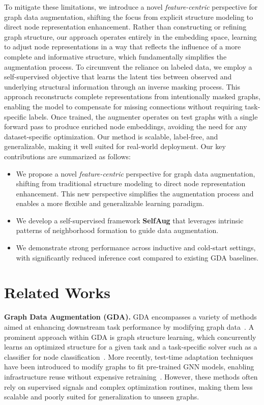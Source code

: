 \documentclass[letterpaper]{article} \usepackage{aaai2026}  \usepackage{times}  \usepackage{helvet}  \usepackage{courier}  \usepackage[hyphens]{url}  \usepackage{graphicx} \urlstyle{rm} \def\UrlFont{\rm}  \usepackage{natbib}  \usepackage{caption} \frenchspacing  \setlength{\pdfpagewidth}{8.5in}  \setlength{\pdfpageheight}{11in}
\begin{document}
To mitigate these limitations, we introduce a novel \textit{feature-centric} perspective for graph data augmentation, shifting the focus from explicit structure modeling to direct node representation enhancement. Rather than constructing or refining graph structure, our approach operates entirely in the embedding space, learning to adjust node representations in a way that reflects the influence of a more complete and informative structure, which fundamentally simplifies the augmentation process.
To circumvent the reliance on labeled data, we employ a self-supervised objective that learns the latent ties between observed and underlying structural information through an inverse masking process. This approach reconstructs complete representations from intentionally masked graphs, enabling the model to compensate for missing connections without requiring task-specific labels. Once trained, the augmenter operates on test graphs with a single forward pass to produce enriched node embeddings, avoiding the need for any dataset-specific optimization. Our method is scalable, label-free, and generalizable, making it well suited for real-world deployment. Our key contributions are summarized as follows:
\begin{itemize}
     \item We propose a novel \textit{feature-centric} perspective for graph data augmentation, shifting from traditional structure modeling to direct node representation enhancement. This new perspective simplifies the augmentation process and enables a more flexible and generalizable learning paradigm.

    \item We develop a self-supervised framework \textbf{SelfAug} that leverages intrinsic patterns of neighborhood formation to guide data augmentation.

    \item We demonstrate strong performance across inductive and cold-start settings, with significantly reduced inference cost compared to existing GDA baselines.
\end{itemize}

\section{Related Works}
\textbf{Graph Data Augmentation (GDA).} GDA encompasses a variety of methods aimed at enhancing downstream task performance by modifying graph data~\cite{ding2022data}. A prominent approach within GDA is graph structure learning, which concurrently learns an optimized structure for a given task and a task-specific solver such as a classifier for node classification~\cite{fatemi2021slaps, franceschi2019learning, chen2020iterative, yu2021graph, zhao2023graphglow, liu2022towards, chen2020learning, liu2021graph}. More recently, test-time adaptation techniques have been introduced to modify graphs to fit pre-trained GNN models, enabling infrastructure reuse without expensive retraining~\cite{jin2022empowering, ju2023graphpatcher}. However, these methods often rely on supervised signals and complex optimization routines, making them less scalable and poorly suited for generalization to unseen graphs.
\end{document}
